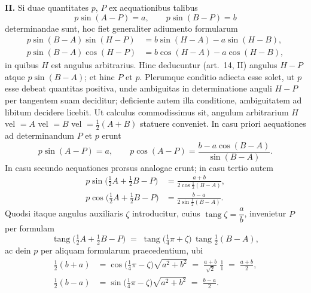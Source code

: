 \documentclass[11pt,a4paper]{article}
\newcommand{\tang}{\operatorname{tang}}
\begin{document}
\textbf{II.} Si duae quantitates $p$, $P$ ex aequationibus talibus
\[
  p \sin(A-P) = a,\qquad p \sin(B-P) = b
\]
determinandae sunt, hoc fiet generaliter adiumento formularum
\begin{align*}
  p \sin(B-A) \sin(H-P) &= b\sin(H-A) - a\sin(H-B),\\
  p \sin(B-A) \cos(H-P) &= b\cos(H-A) - a\cos(H-B),
\end{align*}
in quibus $H$ est angulus arbitrarius. Hinc deducuntur (art.~14, II)
angulus $H-P$ atque $p\sin(B-A)$; et hinc $P$ et $p$. Plerumque
conditio adiecta esse solet, ut $p$ esse debeat quantitas positiva, unde
ambiguitas in determinatione anguli $H-P$ per tangentem suam deciditur;
deficiente autem illa conditione, ambiguitatem ad libitum decidere licebit.
Ut calculus commodissimus sit, angulum arbitrarium $H$ vel $=A$ vel
$=B$ vel $=\tfrac{1}{2}(A+B)$ statuere conveniet.
In casu priori aequationes ad determinandum $P$ et $p$ erunt
\[
  p\sin(A-P) = a,\qquad
  p\cos(A-P) = \frac{b - a\cos(B-A)}{\sin(B-A)}.
\]
In casu secundo aequationes prorsus analogae erunt; in casu tertio autem
\begin{align*}
  p\sin\bigl(\tfrac{1}{2}A+\tfrac{1}{2}B-P\bigr)
     &= \frac{a+b}{2\cos\tfrac{1}{2}(B-A)},\\[2pt]
  p\cos\bigl(\tfrac{1}{2}A+\tfrac{1}{2}B-P\bigr)
     &= \frac{b-a}{2\sin\tfrac{1}{2}(B-A)}.
\end{align*}
Quodsi itaque angulus auxiliaris $\zeta$ introducitur, cuius
$\tang\zeta = \dfrac{a}{b}$, invenietur $P$ per formulam
\[
  \tang\!\bigl(\tfrac{1}{2}A+\tfrac{1}{2}B - P\bigr)
   \;=\; \tang\!\bigl(\tfrac{1}{4}\pi + \zeta\bigr)\,\tang\!\tfrac{1}{2}(B-A),
\]
ac dein $p$ per aliquam formularum praecedentium, ubi
\begin{align*}
  \tfrac{1}{2}(b+a) &= \cos\!\bigl(\tfrac{1}{4}\pi - \zeta\bigr)\sqrt{a^{2}+b^{2}}
                   \;=\; \frac{a+b}{\sqrt{2}}\;\frac{1}{1}
                   \;=\; \frac{a+b}{2},\\[2pt]
  \tfrac{1}{2}(b-a) &= \sin\!\bigl(\tfrac{1}{4}\pi - \zeta\bigr)\sqrt{a^{2}+b^{2}}
                   \;=\; \frac{b-a}{2}.
\end{align*}

\medskip
\end{document}
